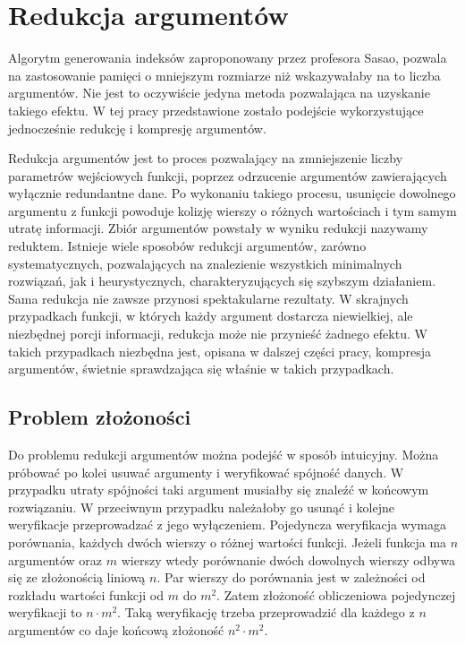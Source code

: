 \chapter{Redukcja argumentów}

Algorytm generowania indeksów zaproponowany przez profesora Sasao,
pozwala na zastosowanie pamięci o mniejszym rozmiarze niż wskazywałaby na to liczba argumentów.
Nie jest to oczywiście jedyna metoda pozwalająca na  uzyskanie takiego efektu.
W tej pracy przedstawione zostało podejście wykorzystujące jednocześnie redukcję i kompresję argumentów.

Redukcja argumentów jest to proces pozwalający na zmniejszenie liczby parametrów wejściowych funkcji,
poprzez odrzucenie argumentów zawierających wyłącznie redundantne dane.
Po wykonaniu takiego procesu,
usunięcie dowolnego argumentu z funkcji powoduje kolizję wierszy o różnych wartościach i tym samym utratę informacji.
Zbiór argumentów powstały w wyniku redukcji nazywamy reduktem.
Istnieje wiele sposobów redukcji argumentów,
zarówno systematycznych,
pozwalających na znalezienie wszystkich minimalnych rozwiązań,
jak i heurystycznych,
charakteryzujących się szybszym działaniem.
Sama redukcja nie zawsze przynosi spektakularne rezultaty.
W skrajnych przypadkach funkcji,
w których każdy argument dostarcza niewielkiej,
ale niezbędnej porcji informacji,
redukcja może nie przynieść żadnego efektu.
W takich przypadkach niezbędna jest,
opisana w dalszej części pracy,
kompresja argumentów,
świetnie sprawdzająca się właśnie w takich przypadkach.

\section{Problem złożoności}

Do problemu redukcji argumentów można podejść w sposób intuicyjny.
Można próbować po kolei usuwać argumenty i weryfikować spójność danych.
W przypadku utraty spójności taki argument musiałby się znaleźć w końcowym rozwiązaniu.
W przeciwnym przypadku należałoby go usunąć i kolejne weryfikacje przeprowadzać z jego wyłączeniem.
Pojedyncza weryfikacja wymaga porównania,
każdych dwóch wierszy o różnej wartości funkcji.
Jeżeli funkcja ma $n$ argumentów oraz $m$ wierszy wtedy porównanie dwóch dowolnych wierszy odbywa się ze złożonością liniową $n$.
Par wierszy do porównania jest w zależności od rozkładu wartości funkcji od $m$ do $m^2$.
Zatem złożoność obliczeniowa pojedynczej weryfikacji to $n \cdot m^2$.
Taką weryfikację trzeba przeprowadzić dla każdego z $n$ argumentów co daje końcową złożoność $n^2 \cdot m^2$.

